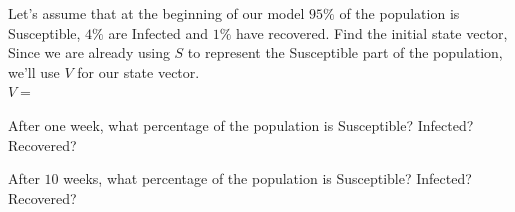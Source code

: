 \documentclass[11pt]{article}
\begin{document}
{{\task Let's assume that at the beginning of our model $95\%$ of the population is Susceptible, $4\%$ are Infected and $1\%$ have recovered. Find the initial state vector, Since we are already using $S$ to represent the Susceptible part of the population, we'll use $V$ for our state vector.  \\
$V=$

\task After one week, what percentage of the population is Susceptible? Infected?\\ Recovered?

\task After $10$ weeks, what percentage of the population is Susceptible? Infected? \\Recovered?
}
\newpage 
{}

}
\end{document}
